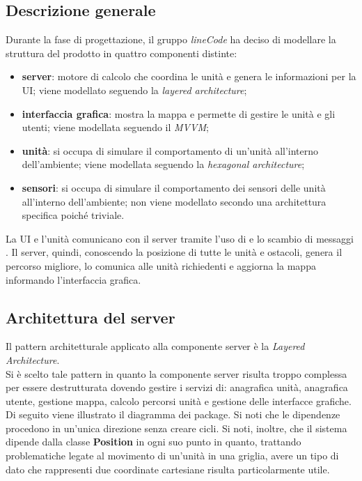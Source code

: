 \subsection{Descrizione generale}
	Durante la fase di progettazione, il gruppo \textit{lineCode} ha deciso di modellare la struttura del prodotto in quattro componenti distinte:
	\begin{itemize}
		\item \textbf{server}: motore di calcolo che coordina le unità e genera le informazioni per la UI; viene modellato seguendo la \textit{layered architecture};
		\item \textbf{interfaccia grafica}: mostra la mappa e permette di gestire le unità e gli utenti; viene modellata seguendo il \textit{MVVM};
		\item \textbf{unità}: si occupa di simulare il comportamento di un'unità all'interno dell'ambiente; viene modellata seguendo la \textit{hexagonal architecture};
		\item \textbf{sensori}: si occupa di simulare il comportamento dei sensori delle unità all'interno dell'ambiente; non viene modellato secondo una architettura specifica poiché triviale.
	\end{itemize}
	La UI e l'unità comunicano con il server tramite l'uso di  e lo scambio di messaggi . Il server, quindi, conoscendo la posizione di tutte le unità e ostacoli, genera il percorso migliore, lo comunica alle unità richiedenti e aggiorna la mappa informando l'interfaccia grafica.\\

\subsection{Architettura del server}
	Il pattern architetturale applicato alla componente server è la \textit{Layered Architecture}. \\
	Si è scelto tale pattern in quanto la componente server risulta troppo complessa per essere destrutturata dovendo gestire i servizi di: anagrafica unità, anagrafica utente, gestione mappa, calcolo percorsi unità e gestione delle interfacce grafiche.\\
	Di seguito viene illustrato il diagramma dei package. Si noti che le dipendenze procedono in un'unica direzione senza creare cicli. Si noti, inoltre, che il sistema dipende dalla classe \textbf{Position} in ogni suo punto in quanto, trattando problematiche legate al movimento di un'unità in una griglia, avere un tipo di dato che rappresenti due coordinate cartesiane risulta particolarmente utile.

